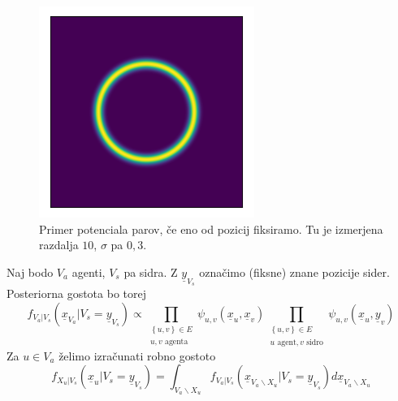 \documentclass{beamer}
\theoremstyle{definition}
\begin{document}

	\begin{frame}
		\begin{figure}[t]
			\includegraphics[width=7cm]{"pairwise_potential.png"}
			\caption{Primer potenciala parov, če eno od pozicij fiksiramo. Tu je izmerjena razdalja $10$, $\sigma$ pa $0{,}3$.}
			\centering
		\end{figure}
	\end{frame}

	\begin{frame}
		Naj bodo $V_a$ agenti, $V_s$ pa sidra.
		Z $\underline{y}_{V_s}$ označimo (fiksne) znane pozicije sider.
		Posteriorna gostota bo torej
		$$
		f_{V_a | V_s}\left(\underline{x}_{V_a} | V_s = \underline{y}_{V_s}\right) \propto
		\prod_{\substack{\left\{u,v\right\} \in E \\ u,v \text{ agenta}}}\psi_{u,v}\left(\underline{x}_u,\underline{x}_v\right)
		\prod_{\substack{\left\{u,v\right\} \in E \\ u\text{ agent}, v \text{ sidro}}}\psi_{u,v}\left(\underline{x}_u,\underline{y}_v\right)
		$$
		\pause
		Za $u \in V_a$ želimo izračunati robno gostoto
		$$
		f_{X_u | V_s}\left(\underline{x}_u | V_s = \underline{y}_{V_s}\right) =
		\int_{V_a\backslash X_u} f_{V_a | V_s}\left(\underline{x}_{V_a\backslash X_u} | V_s = \underline{y}_{V_s}\right)
		d\underline{x}_{V_a\backslash X_u}
		$$
	\end{frame}
\end{document}

